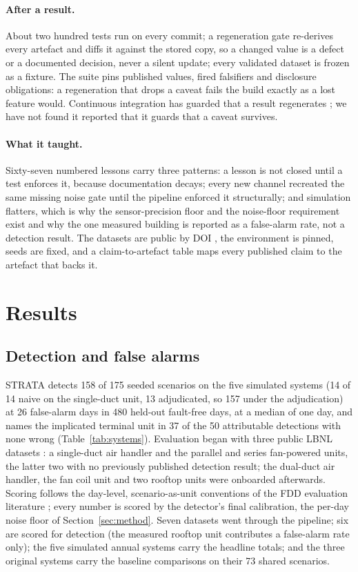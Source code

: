 \documentclass[11pt,letterpaper]{article}
\begin{document}
\paragraph{After a result.} About two hundred tests run on every commit; a regeneration gate re-derives every artefact and diffs it against the stored copy, so a changed value is a defect or a documented decision, never a silent update; every validated dataset is frozen as a fixture. The suite pins published values, fired falsifiers and disclosure obligations: a regeneration that drops a caveat fails the build exactly as a lost feature would. Continuous integration has guarded that a result regenerates \cite{jimenez2017popper}; we have not found it reported that it guards that a caveat survives.

\paragraph{What it taught.} Sixty-seven numbered lessons carry three patterns: a lesson is not closed until a test enforces it, because documentation decays; every new channel recreated the same missing noise gate until the pipeline enforced it structurally; and simulation flatters, which is why the sensor-precision floor and the noise-floor requirement exist and why the one measured building is reported as a false-alarm rate, not a detection result. The datasets are public by DOI \cite{granderson2022lbnlfdddatasets,granderson2023lbnlfdddata}, the environment is pinned, seeds are fixed, and a claim-to-artefact table maps every published claim to the artefact that backs it.

\section{Results}
\label{sec:results}
\subsection{Detection and false alarms}
STRATA detects 158 of 175 seeded scenarios on the five simulated systems (14 of 14 naive on the single-duct unit, 13 adjudicated, so 157 under the adjudication) at 26 false-alarm days in 480 held-out fault-free days, at a median of one day, and names the implicated terminal unit in 37 of the 50 attributable detections with none wrong (Table~\ref{tab:systems}). Evaluation began with three public LBNL datasets \cite{granderson2023lbnlfdddata}: a single-duct air handler and the parallel and series fan-powered units, the latter two with no previously published detection result; the dual-duct air handler, the fan coil unit and two rooftop units were onboarded afterwards. Scoring follows the day-level, scenario-as-unit conventions of the FDD evaluation literature \cite{frank2018fddevaluation}; every number is scored by the detector's final calibration, the per-day noise floor of Section~\ref{sec:method}. Seven datasets went through the pipeline; six are scored for detection (the measured rooftop unit contributes a false-alarm rate only); the five simulated annual systems carry the headline totals; and the three original systems carry the baseline comparisons on their 73 shared scenarios.
\end{document}
